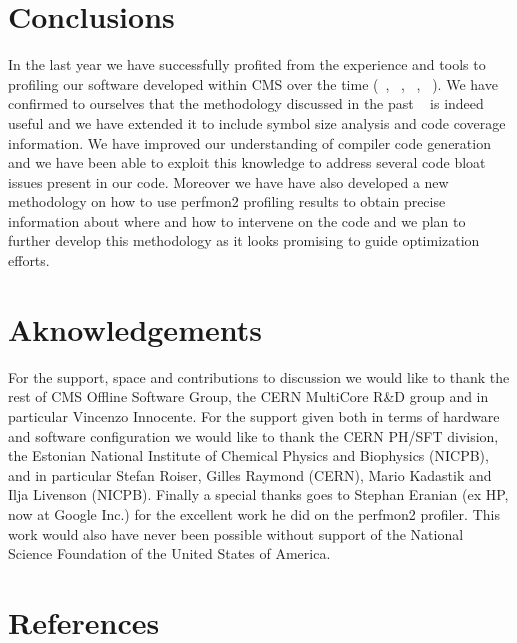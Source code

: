 \documentclass[a4paper]{jpconf}
\begin{document}
\section{Conclusions}
\label{conclusions}

In the last year we have successfully profited from the experience and tools to profiling our software developed within CMS over the time (~\cite{Tuura:2008p00019}, ~\cite{Elmer:2009}, ~\cite{Eulisse:2004}, ~\cite{Eulisse:2004igprof}). We have confirmed to ourselves that the methodology discussed in the past ~\cite{Tuura:2008p00019} is indeed useful and we have extended it to include symbol size analysis and code coverage information. We have improved our understanding of compiler code generation and we have been able to exploit this knowledge to address several code bloat issues present in our code. Moreover we have have also developed a new methodology on how to use perfmon2 profiling results to obtain precise information about where and how to intervene on the code and we plan to further develop this methodology as it looks promising to guide optimization efforts.


\section{Aknowledgements}
\label{aknowledgements}

For the support, space and contributions to discussion we would like to thank the rest of CMS Offline Software Group, the CERN MultiCore R\&D group and in particular Vincenzo Innocente. For the support given both in terms of hardware and software configuration we would like to thank the CERN PH/SFT division, the Estonian National Institute of Chemical Physics and Biophysics (NICPB), and in particular Stefan Roiser, Gilles Raymond (CERN), Mario Kadastik and Ilja Livenson (NICPB). Finally a special thanks goes to Stephan Eranian (ex HP, now at Google Inc.) for the excellent work he did on the perfmon2 profiler. This work would also have never been possible without support of the National Science Foundation of the United States of America.


\section{References}
\label{references}
\end{document}
